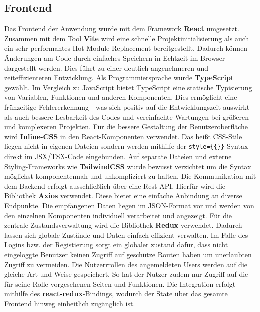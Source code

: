 \documentclass[conference,a4paper]{cs-techrep}
\begin{document}
\subsection{Frontend}
Das Frontend der Anwendung wurde mit dem Framework \textbf{React} umgesetzt. Zusammen mit dem Tool \textbf{Vite} wird eine schnelle Projektinitialisierung als auch ein sehr performantes Hot Module Replacement bereitgestellt. Dadurch können Änderungen am Code durch einfaches Speichern in Echtzeit im Browser dargestellt werden. Dies führt zu einer deutlich angenehmeren und zeiteffizienteren Entwicklung. \newline
Als Programmiersprache wurde \textbf{TypeScript} gewählt. Im Vergleich zu JavaScript bietet TypeScript eine statische Typisierung von Variablen, Funktionen und anderen Komponenten. Dies ermöglicht eine frühzeitige Fehlererkennung - was sich positiv auf die Entwicklungszeit auswirkt - als auch bessere Lesbarkeit des Codes und vereinfachte Wartungen bei größeren und komplexeren Projekten. \newline
Für die bessere Gestaltung der Benutzeroberfläche wird \textbf{Inline-CSS} in den React-Komponenten verwendet. Das heißt CSS-Stile liegen nicht in eigenen Dateien sondern werden mithilfe der \texttt{style=\{\{\}\}}-Syntax direkt im JSX/TSX-Code eingebunden. Auf separate Dateien und externe Styling-Frameworks wie \textbf{TailwindCSS} wurde bewusst verzichtet um die Syntax möglichst komponentennah und unkompliziert zu halten.	\newline
Die Kommunikation mit dem Backend erfolgt ausschließlich über eine Rest-API. Hierfür wird die Bibliothek \textbf{Axios} verwendet. Diese bietet eine einfache Anbindung an diverse Endpunkte. Die empfangenen Daten liegen im JSON-Format vor und werden von den einzelnen Komponenten individuell verarbeitet und angezeigt. \newline
Für die zentrale Zustandsverwaltung wird die Bibliothek \textbf{Redux} verwendet. Dadurch lassen sich globale Zustände und Daten einfach effizient verwalten. Im Falle des Logins bzw. der Registierung sorgt ein globaler zustand dafür, dass nicht eingeloggte Benutzer keinen Zugriff auf geschütze Routen haben um unerlaubten Zugriff zu vermeiden. Die Nutzerrrollen des angemeldeten Users werden auf die gleiche Art und Weise gespeichert. So hat der Nutzer zudem nur Zugriff auf die für seine Rolle vorgesehenen Seiten und Funktionen. Die Integration erfolgt mithilfe des \textbf{react-redux}-Bindings, wodurch der State über das gesamte Frontend hinweg einheitlich zugänglich ist.
\end{document}
